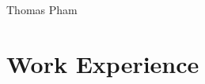 \documentclass[12pt]{article} %
\begin{document}
\begin{paracol}{2} %


\parbox[top][0.12\textheight][c]{\linewidth}{ %
	\vspace{-0.04\textheight} %
	\centering %
	{\sffamily\Huge Thomas Pham}\\\medskip %
}


\section{Work Experience}






\end{paracol}
\end{document}
